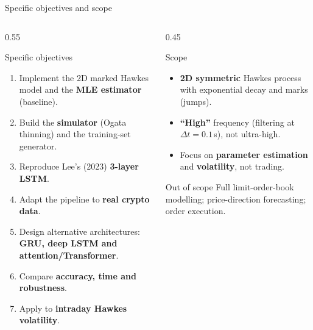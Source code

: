 \documentclass[aspectratio=169]{beamer}
\begin{document}
\begin{frame}{Specific objectives and scope}
  \begin{columns}[T]
    \begin{column}{0.55\textwidth}
      \begin{block}{Specific objectives}
        \begin{enumerate}\footnotesize
          \item Implement the 2D marked Hawkes model and the \textbf{MLE estimator} (baseline).
          \item Build the \textbf{simulator} (Ogata thinning) and the training-set generator.
          \item Reproduce Lee's (2023) \textbf{3-layer LSTM}.
          \item Adapt the pipeline to \textbf{real crypto data}.
          \item Design alternative architectures: \textbf{GRU, deep LSTM and attention/Transformer}.
          \item Compare \textbf{accuracy, time and robustness}.
          \item Apply to \textbf{intraday Hawkes volatility}.
        \end{enumerate}
      \end{block}
    \end{column}
    \begin{column}{0.45\textwidth}
      \begin{block}{Scope}
        \begin{itemize}\footnotesize
          \item \textbf{2D symmetric} Hawkes process with exponential decay and marks (jumps).
          \item \textbf{``High''} frequency (filtering at $\Delta t=0.1$\,s), not ultra-high.
          \item Focus on \textbf{parameter estimation} and \textbf{volatility}, not trading.
        \end{itemize}
      \end{block}
      \begin{alertblock}{Out of scope}
        Full limit-order-book modelling; price-direction forecasting; order execution.
      \end{alertblock}
    \end{column}
  \end{columns}
\end{frame}

\end{document}
